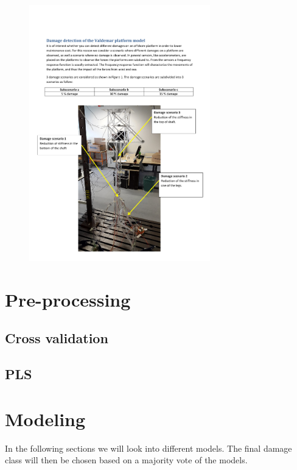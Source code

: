 \documentclass[a4paper,draft=false]{scrreprt}\usepackage[]{graphicx}\usepackage[]{color}
\begin{document}
\begin{figure}[hb]
\begin{center}
\includegraphics[width=0.7\textwidth]{Valdemarplatform}
\end{center}
\end{figure}

\chapter{Pre-processing}
\section{Cross validation} %
\section{PLS} %

\chapter{Modeling}


In the following sections we will look into different models. The final damage class will then be chosen based on a majority vote of the models.
\end{document}
